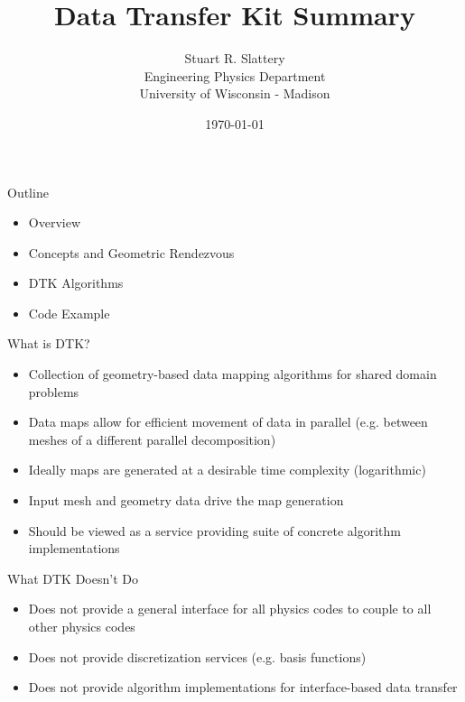 \documentclass{beamer}
\author{Stuart R. Slattery
  \\ Engineering Physics Department
  \\ University of Wisconsin - Madison
}
\date{\today}
\title{Data Transfer Kit Summary}
\begin{document}
\maketitle

\begin{frame}{Outline}

  \begin{itemize}
  \item Overview
    \medskip
  \item Concepts and Geometric Rendezvous
    \medskip
  \item DTK Algorithms
    \medskip
  \item Code Example
  \end{itemize}

\end{frame}

\begin{frame}{What is DTK?}

  \begin{itemize}
  \item Collection of geometry-based data mapping algorithms for
    shared domain problems
    \medskip
  \item Data maps allow for efficient movement of data in parallel
    (e.g. between meshes of a different parallel decomposition)
    \medskip
  \item Ideally maps are generated at a desirable time complexity
    (logarithmic)
    \medskip
  \item Input mesh and geometry data drive the map generation
    \medskip
  \item Should be viewed as a service providing suite of concrete
    algorithm implementations
  \end{itemize}
 
\end{frame}

\begin{frame}{What DTK Doesn't Do}

  \begin{itemize}
  \item Does not provide a general interface for all physics codes to
    couple to all other physics codes
    \medskip
  \item Does not provide discretization services (e.g. basis functions)
    \medskip
  \item Does not provide algorithm implementations for interface-based
    data transfer
  \end{itemize}

\end{frame}
\end{document}
